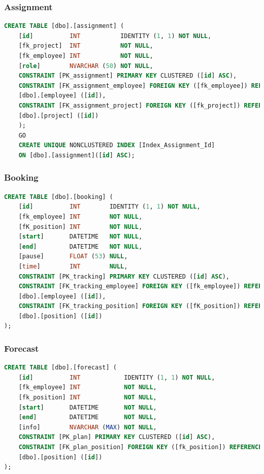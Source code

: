 \documentclass{article}
\begin{document}
\subsubsection{Assignment}
\begin{lstlisting}[language=Sql, caption= Create Table Statement für Assignment Table]
    CREATE TABLE [dbo].[assignment] (
    [id]          INT           IDENTITY (1, 1) NOT NULL,
    [fk_project]  INT           NOT NULL,
    [fk_employee] INT           NOT NULL,
    [role]        NVARCHAR (50) NOT NULL,
    CONSTRAINT [PK_assignment] PRIMARY KEY CLUSTERED ([id] ASC),
    CONSTRAINT [FK_assignment_employee] FOREIGN KEY ([fk_employee]) REFERENCES
    [dbo].[employee] ([id]),
    CONSTRAINT [FK_assignment_project] FOREIGN KEY ([fk_project]) REFERENCES
    [dbo].[project] ([id])
    );
    GO
    CREATE UNIQUE NONCLUSTERED INDEX [Index_Assignment_Id]
    ON [dbo].[assignment]([id] ASC);


         \end{lstlisting}
\subsubsection{Booking}
\begin{lstlisting}[language=Sql, caption= Create Table Statement für Booking Table]
    CREATE TABLE [dbo].[booking] (
    [id]          INT        IDENTITY (1, 1) NOT NULL,
    [fk_employee] INT        NOT NULL,
    [fK_position] INT        NOT NULL,
    [start]       DATETIME   NOT NULL,
    [end]         DATETIME   NOT NULL,
    [pause]       FLOAT (53) NULL,
    [time]        INT        NULL,
    CONSTRAINT [PK_tracking] PRIMARY KEY CLUSTERED ([id] ASC),
    CONSTRAINT [FK_tracking_employee] FOREIGN KEY ([fk_employee]) REFERENCES
    [dbo].[employee] ([id]),
    CONSTRAINT [FK_tracking_position] FOREIGN KEY ([fK_position]) REFERENCES
    [dbo].[position] ([id])
);


         \end{lstlisting}
\subsubsection{Forecast}
\begin{lstlisting}[language=Sql, caption= Create Table Statement für Forecast Table]
    CREATE TABLE [dbo].[forecast] (
    [id]          INT            IDENTITY (1, 1) NOT NULL,
    [fk_employee] INT            NOT NULL,
    [fk_position] INT            NOT NULL,
    [start]       DATETIME       NOT NULL,
    [end]         DATETIME       NOT NULL,
    [info]        NVARCHAR (MAX) NOT NULL,
    CONSTRAINT [PK_plan] PRIMARY KEY CLUSTERED ([id] ASC),
    CONSTRAINT [FK_plan_position] FOREIGN KEY ([fk_position]) REFERENCES 
    [dbo].[position] ([id])
);


         \end{lstlisting}
\end{document}
